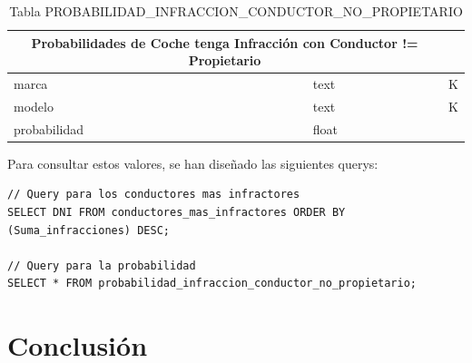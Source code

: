 \documentclass[]{article}
\begin{document}
\begin{itemize}
     \begin{table}[H]
        \centering
        \begin{tabular}{lll} 
            \toprule
            \multicolumn{2}{c}{\large\textbf{Probabilidades de Coche tenga Infracción con Conductor != Propietario}} \\ 
            \midrule
            marca      & text & K\\
            modelo     & text & K\\
            probabilidad   & float & \\
            \bottomrule
        \end{tabular}
        \caption {Tabla PROBABILIDAD\_INFRACCION\_CONDUCTOR\_NO\_PROPIETARIO}
     \end{table}

    Para consultar estos valores, se han diseñado las siguientes querys:

    \begin{lstlisting}[language=cql, caption=Querys para el caso de uso 3]
// Query para los conductores mas infractores
SELECT DNI FROM conductores_mas_infractores ORDER BY (Suma_infracciones) DESC;

// Query para la probabilidad
SELECT * FROM probabilidad_infraccion_conductor_no_propietario;

    \end{lstlisting}
\end{itemize}


\newpage
\section{Conclusión}
\label{sec:conclusion}
\end{document}
